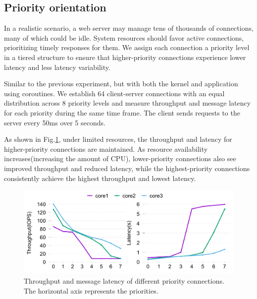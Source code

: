 \documentclass[conference]{IEEEtran}
\begin{document}
\subsection{Priority orientation}

In a realistic scenario, a web server may manage tens of thousands of connections, many of which could be idle. System resources should favor active connections, prioritizing timely responses for them. We assign each connection a priority level in a tiered structure to ensure that higher-priority connections experience lower latency and less latency variability.

Similar to the previous experiment, but with both the kernel and application using coroutines. We establish 64 client-server connections with an equal distribution across 8 priority levels and measure throughput and message latency for each priority during the same time frame. The client sends requests to the server every 50ms over 5 seconds.

As shown in Fig.\ref{fig:prio-throughput-latency}, under limited resources, the throughput and latency for higher-priority connections are maintained. As resource availability increases(increasing the amount of CPU), lower-priority connections also see improved throughput and reduced latency, while the highest-priority connections consistently achieve the highest throughput and lowest latency.

\begin{figure}[tbp]
  \centering
  \includegraphics[width=\linewidth]{assets/prio-tl.pdf}
	\caption{Throughput and message latency of different priority connections. The horizontal axis represents the priorities.}
  \label{fig:prio-throughput-latency}
  \vspace{-1em}
\end{figure}
\end{document}
